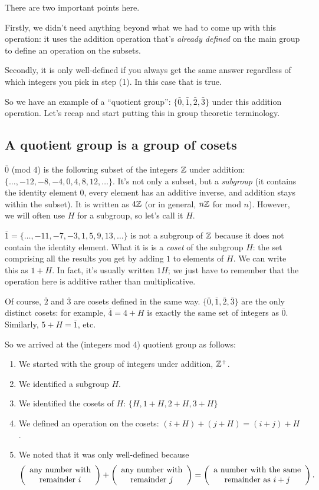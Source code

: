 There are two important points here.

Firstly, we didn't need anything beyond what we had to come up with this
operation: it uses the addition operation that's \emph{already defined} on the
main group to define an operation on the subsets.

Secondly, it is only well-defined if you always get the same answer regardless
of which integers you pick in step (1). In this case that is true.

So we have an example of a ``quotient group'': $\{\bar 0, \bar 1, \bar 2, \bar
3\}$ under this addition operation. Let's recap and start putting this in group
theoretic terminology.


\subsection{A quotient group is a group of cosets}

$\bar 0$ (mod $4$) is the following subset of the integers $\mathbb{Z}$ under addition:
$\{\ldots, -12, -8, -4, 0, 4, 8, 12, \ldots\}$. It's not only a subset, but a
\emph{subgroup} (it contains the identity element $0$, every element has an
additive inverse, and addition stays within the subset). It is written as $4\mathbb{Z}$
(or in general, $n\mathbb{Z}$ for mod $n$). However, we will often use $H$ for a
subgroup, so let's call it $H$.

$\bar 1 = \{\ldots, -11, -7, -3, 1, 5, 9, 13, \ldots\}$ is not a subgroup of
$\mathbb{Z}$ because it does not contain the identity element. What it is is a
\emph{coset} of the subgroup $H$: the set comprising all the results you get by
adding $1$ to elements of $H$. We can write this as $1 + H$. In fact, it's
usually written $1H$; we just have to remember that the operation here is
additive rather than multiplicative.

Of course, $\bar 2$ and $\bar 3$ are cosets defined in the same way. $\{\bar 0,
\bar 1, \bar 2, \bar 3\}$ are the only distinct cosets: for example, $\bar 4 =
4+H$ is exactly the same set of integers as $\bar 0$. Similarly, $5 + H = \bar
1$, etc.

So we arrived at the (integers mod $4$) quotient group as follows:

\begin{enumerate}
\item We started with the group of integers under addition, $\mathbb{Z}^+$.
\item We identified a subgroup $H$.
\item We identified the cosets of $H$: $\{H, 1+H, 2+H, 3+H\}$
\item We defined an operation on the cosets: $(i+H) + (j+H) = (i+j)+H$.
\item We noted that it was only well-defined because
  \begin{align*}
    \left(\begin{array}{c} \text{any number with} \\ \text{remainder $i$} \end{array}\right) +
    \left(\begin{array}{c} \text{any number with} \\ \text{remainder $j$} \end{array}\right) =
    \left(\begin{array}{c} \text{a number with the same} \\ \text{remainder as $i+j$} \end{array}\right).
  \end{align*}
\end{enumerate}

